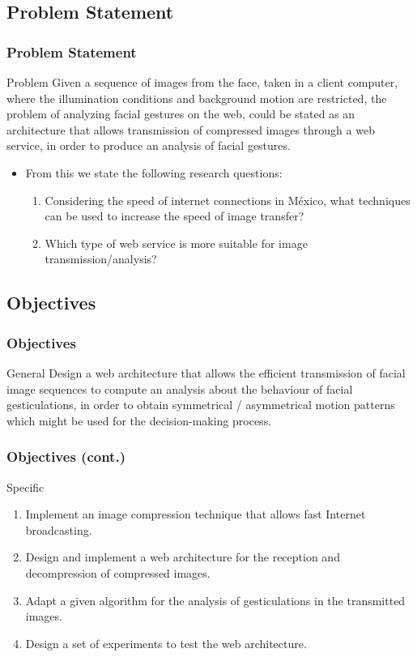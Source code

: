 \documentclass[compress]{beamer}
\begin{document}
\subsection{Problem Statement}
\begin{frame}
	\frametitle{Problem Statement}
	\begin{alertblock}{Problem}
	Given a sequence of images from the face, taken in a client computer, where the illumination conditions and background motion are restricted, the problem of analyzing facial gestures on the web, could be stated as an architecture that allows transmission of compressed images through a web service, in order to produce an analysis of facial gestures.
	\end{alertblock}

	\begin{itemize}
		\item From this we state the following research questions:
		\begin{enumerate}
			\item Considering the speed of internet connections in M\'exico, what techniques can be used to increase the speed of image transfer?
			\item Which type of web service is more suitable for image transmission/analysis?
		\end{enumerate}
	\end{itemize}
\end{frame}

\subsection{Objectives}
\begin{frame}
	\frametitle{Objectives}
	\begin{block}{General}
	Design a web architecture that allows the efficient transmission of facial image sequences to compute an analysis about the behaviour of facial gesticulations, in order to obtain symmetrical / asymmetrical motion patterns which might be used for the decision-making process.
	\end{block}
\end{frame}

\begin{frame}
	\frametitle{Objectives (cont.)}
	\begin{block}{Specific}
		\begin{enumerate}		
		\item Implement an image compression technique that allows fast Internet broadcasting.
		\item Design and implement a web architecture for the reception and decompression of compressed images.
		\item Adapt a given algorithm for the analysis of gesticulations in the transmitted images.
		\item Design a set of experiments to test the web architecture.
		\end{enumerate}
	\end{block}
\end{frame}
\end{document}
